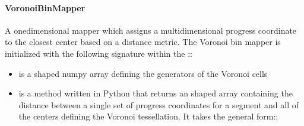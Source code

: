 \documentclass[letterpaper,10pt,english]{sphinxmanual}
\begin{document}
\paragraph{VoronoiBinMapper}
\label{\detokenize{users_guide/west/setup:voronoibinmapper}}
A one\sphinxhyphen{}dimensional mapper which assigns a multidimensional progress coordinate
to the closest center based on a distance metric. The Voronoi bin mapper is
initialized with the following signature within the
::

\begin{sphinxVerbatim}[commandchars=\\\{\}]
     
\end{sphinxVerbatim}
\begin{itemize}
\item {} 
 is a  shaped numpy array defining
the generators of the Voronoi cells

\item {} 
 is a method written in Python that returns an 
shaped array containing the distance between a single set of progress
coordinates for a segment and all of the centers defining the Voronoi
tessellation. It takes the general form::

\begin{sphinxVerbatim}[commandchars=\\\{\}]
    
     
\end{sphinxVerbatim}

\end{itemize}
\end{document}
